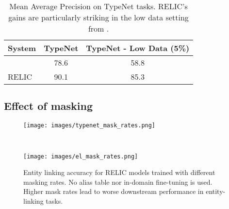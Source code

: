 \documentclass{article} \usepackage{iclr2020_conference,times}
\newcommand{\ack}{RELIC\xspace}
\begin{document}
\begin{table}[]
    \centering
    \begin{tabular}{|l|c|c|}
    \hline
    System & TypeNet & TypeNet - Low Data (5\%) \\\hline
    \citealt{murty2018hierarchical} & 78.6 & 58.8 \\
    \ack & 90.1 & 85.3 \\\hline
    \end{tabular}
    \caption{Mean Average Precision on TypeNet tasks. \ack's gains are particularly striking in the low data setting from \cite{murty2018hierarchical}.}
    \label{tab:typenet_results}
\end{table}

\subsection{Effect of masking} \label{sec:masking_ablation}

\begin{figure}[t!]
    \centering
    \begin{minipage}{.45\textwidth}
        \centering
        \texttt{[image: images/typenet\_mask\_rates.png]}
        \caption{TypeNet entity-level typing mAP on the development set for \ack models trained with different masking rates. A higher mask rate leads to better performance, both in low and high-data situations.}
        \label{fig:typenet_mask_rates}
    \end{minipage}~~~~~~~~~~~~~~~~~~~~~
    \begin{minipage}{0.45\textwidth}
        \centering
        \texttt{[image: images/el\_mask\_rates.png]}
        \caption{Entity linking accuracy for \ack models trained with different masking rates. No alias table nor in-domain fine-tuning is used. Higher mask rates lead to worse downstream performance in entity-linking tasks.}
        \label{fig:el_mask_rates}
    \end{minipage}
\end{figure}
\end{document}
